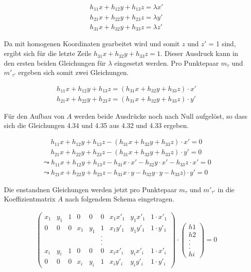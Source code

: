 \begin{gather}
	h_{11}x+h_{12}y+h_{13}z= \lambda x'\\
	h_{21}x+h_{22}y+h_{23}z= \lambda y'\\
	h_{31}x+h_{32}y+h_{33}z= \lambda z'
\end{gather}

Da mit homogenen Koordinaten gearbeitet wird und somit $z$ und $z'$ = 1 sind, ergibt sich für die letzte Zeile $h_{31}x+h_{32}y+h_{33}z= 1$. Dieser Ausdruck kann in den ersten beiden Gleichungen für $\lambda$ eingesetzt werden. Pro Punktepaar $m_\tau$ und $m'_{\tau'}$ ergeben sich somit zwei Gleichungen. 

\begin{gather}
	h_{11}x+h_{12}y+h_{13}z= (h_{31}x+h_{32}y+h_{33}z) \cdot x'\\
	h_{21}x+h_{22}y+h_{23}z= (h_{31}x+h_{32}y+h_{33}z) \cdot y'
\end{gather}

Für den Aufbau von $A$ werden beide Ausdrücke noch nach Null aufgelöst, so dass sich die Gleichungen 4.34 und 4.35 aus 4.32 und 4.33 ergeben.

\begin{gather}
	h_{11}x+h_{12}y+h_{13}z -(h_{31}x+h_{32}y+h_{33}z) \cdot x'= 0 \\	h_{21}x+h_{22}y+h_{23}z-(h_{31}x+h_{32}y+h_{33}z) \cdot y'=0
\end{gather}
\begin{gather}
	\leadsto h_{11}x+h_{12}y+h_{13}z -h_{31}x\cdot x' - h_{32}y \cdot x'-h_{33}z\cdot x'= 0\\
	\leadsto h_{21}x+h_{22}y+h_{23}z-h_{31}x\cdot y -h_{32}y \cdot y -h_{33}z) \cdot y'=0
\end{gather}

Die enstandnen Gleichungen werden jetzt pro Punktepaar $m_\tau$ und $m'_{\tau'}$ in die Koeffizientmatrix $A$ nach folgendem Schema eingetragen.\cite{Elements,HZ,Schwarz,Heipke}

\begin{gather}
	\begin{pmatrix}
		x_1&y_1&1&0&0&0&x_1 x'_1&y_1 x'_1 & 1\cdot x'_1\\
		0&0&0&x_1&y_1&1&x_1 y'_1&y_1 y'_1 & 1\cdot y'_1\\
		&&&&&.&&&\\	
		&&&&&.&&&\\	
		&&&&&.&&&\\	
		x_i&y_i&1&0&0&0&x_i x'_i&y_i x'_i & 1\cdot x'_i\\
		0&0&0&x_i&y_i&1&x_i y'_i&y_i y'_i & 1\cdot y'_i
	\end{pmatrix}
	\cdot
	\begin{pmatrix}
		h1\\h2\\.\\.\\.\\hi
	\end{pmatrix}
	=0
\end{gather}

